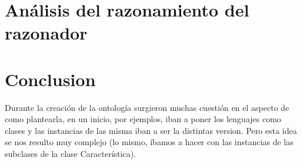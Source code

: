 \documentclass[12pt, titlepage, a4paper]{article}
\begin{document}
\section{Análisis del razonamiento del razonador}


\section{Conclusion}
Durante la creación de la ontología surgieron muchas cuestión en el 
aspecto de como plantearla, en un inicio, por ejemplos, iban a poner 
los lenguajes como clases y las instancias de las misma iban a ser la 
distintas version. Pero esta idea se nos resulto muy complejo 
(lo mismo, íbamos a hacer con las instancias de las subclases de 
la clase Característica).

\end{document}
